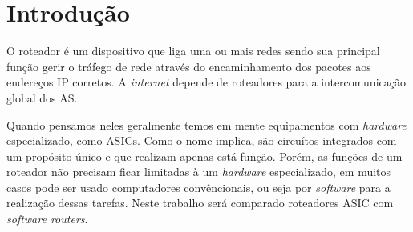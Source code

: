 \section{Introdução}

O roteador é um dispositivo que liga uma ou mais redes sendo sua principal função gerir o tráfego de rede através do encaminhamento dos pacotes aos endereços \ac{IP} corretos. A \textit{internet} depende de roteadores para a intercomunicação global dos \ac{AS}. 

Quando pensamos neles geralmente temos em mente equipamentos com \textit{hardware} especializado, como \acp{ASIC}. Como o nome implica, são circuítos integrados com um propósito único e que realizam apenas está função. Porém, as funções de um roteador não precisam ficar limitadas à um \textit{hardware} especializado, em muitos casos pode ser usado computadores convêncionais, ou seja por \textit{software} para a realização dessas tarefas. Neste trabalho será comparado roteadores \ac{ASIC} com \textit{software routers}.




